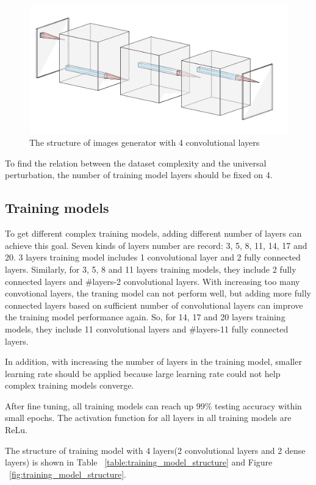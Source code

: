 \documentclass{article}
\begin{document}
\begin{figure}[h]
    \centering
    \includegraphics[width=1\linewidth]{generator_structure.png}
    \caption{\small The structure of images generator with 4 convolutional layers}
    \label{fig:generator_structure}
\end{figure}

To find the relation between the dataset complexity and the universal perturbation, the number of training model layers should be fixed on 4.
\subsection{Training models}

To get different complex training models, adding different number of layers can achieve this goal. Seven kinds of layers number are record: 3, 5, 8, 11, 14, 17 and 20. 3 layers training model includes 1 convolutional layer and 2 fully connected layers. Similarly, for 3, 5, 8 and 11 layers training models, they include 2 fully connected layers and \#layers-2 convolutional layers. With increasing too many convotional layers, the traning model can not perform well, but adding more fully connected layers based on sufficient number of convolutional layers can improve the training model performance again. So, for 14, 17 and 20 layers training models, they include 11 convolutional layers and \#layers-11 fully connected layers.

In addition, with increasing the number of layers in the training model, smaller learning rate should be applied because large learning rate could not help complex training models converge.

After fine tuning, all training models can reach up $99\%$ testing accuracy within small epochs. The activation function for all layers in all training models are ReLu. 

The structure of training model with 4 layers(2 convolutional layers and 2 dense layers) is shown in Table ~\ref{table:training_model_structure} and Figure ~\ref{fig:training_model_structure}.
\end{document}
